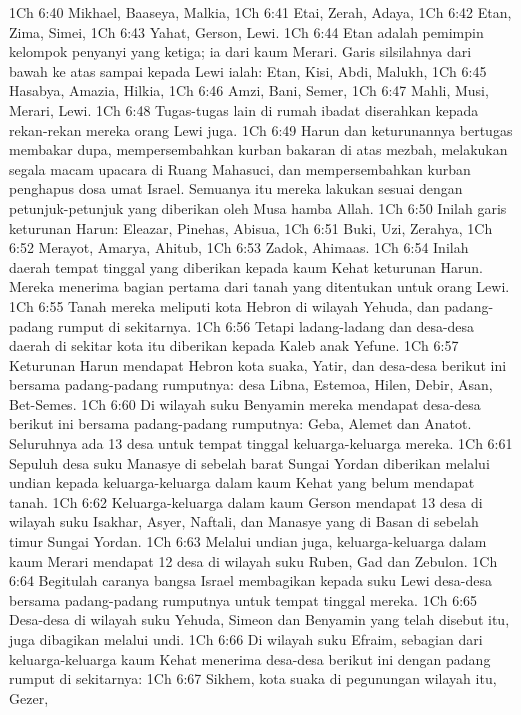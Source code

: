 1Ch 6:40  Mikhael, Baaseya, Malkia,
1Ch 6:41  Etai, Zerah, Adaya,
1Ch 6:42  Etan, Zima, Simei,
1Ch 6:43  Yahat, Gerson, Lewi.
1Ch 6:44  Etan adalah pemimpin kelompok penyanyi yang ketiga; ia dari kaum Merari. Garis silsilahnya dari bawah ke atas sampai kepada Lewi ialah: Etan, Kisi, Abdi, Malukh,
1Ch 6:45  Hasabya, Amazia, Hilkia,
1Ch 6:46  Amzi, Bani, Semer,
1Ch 6:47  Mahli, Musi, Merari, Lewi.
1Ch 6:48  Tugas-tugas lain di rumah ibadat diserahkan kepada rekan-rekan mereka orang Lewi juga.
1Ch 6:49  Harun dan keturunannya bertugas membakar dupa, mempersembahkan kurban bakaran di atas mezbah, melakukan segala macam upacara di Ruang Mahasuci, dan mempersembahkan kurban penghapus dosa umat Israel. Semuanya itu mereka lakukan sesuai dengan petunjuk-petunjuk yang diberikan oleh Musa hamba Allah.
1Ch 6:50  Inilah garis keturunan Harun: Eleazar, Pinehas, Abisua,
1Ch 6:51  Buki, Uzi, Zerahya,
1Ch 6:52  Merayot, Amarya, Ahitub,
1Ch 6:53  Zadok, Ahimaas.
1Ch 6:54  Inilah daerah tempat tinggal yang diberikan kepada kaum Kehat keturunan Harun. Mereka menerima bagian pertama dari tanah yang ditentukan untuk orang Lewi.
1Ch 6:55  Tanah mereka meliputi kota Hebron di wilayah Yehuda, dan padang-padang rumput di sekitarnya.
1Ch 6:56  Tetapi ladang-ladang dan desa-desa daerah di sekitar kota itu diberikan kepada Kaleb anak Yefune.
1Ch 6:57  Keturunan Harun mendapat Hebron kota suaka, Yatir, dan desa-desa berikut ini bersama padang-padang rumputnya: desa Libna, Estemoa, Hilen, Debir, Asan, Bet-Semes.
1Ch 6:60  Di wilayah suku Benyamin mereka mendapat desa-desa berikut ini bersama padang-padang rumputnya: Geba, Alemet dan Anatot. Seluruhnya ada 13 desa untuk tempat tinggal keluarga-keluarga mereka.
1Ch 6:61  Sepuluh desa suku Manasye di sebelah barat Sungai Yordan diberikan melalui undian kepada keluarga-keluarga dalam kaum Kehat yang belum mendapat tanah.
1Ch 6:62  Keluarga-keluarga dalam kaum Gerson mendapat 13 desa di wilayah suku Isakhar, Asyer, Naftali, dan Manasye yang di Basan di sebelah timur Sungai Yordan.
1Ch 6:63  Melalui undian juga, keluarga-keluarga dalam kaum Merari mendapat 12 desa di wilayah suku Ruben, Gad dan Zebulon.
1Ch 6:64  Begitulah caranya bangsa Israel membagikan kepada suku Lewi desa-desa bersama padang-padang rumputnya untuk tempat tinggal mereka.
1Ch 6:65  Desa-desa di wilayah suku Yehuda, Simeon dan Benyamin yang telah disebut itu, juga dibagikan melalui undi.
1Ch 6:66  Di wilayah suku Efraim, sebagian dari keluarga-keluarga kaum Kehat menerima desa-desa berikut ini dengan padang rumput di sekitarnya:
1Ch 6:67  Sikhem, kota suaka di pegunungan wilayah itu, Gezer,
